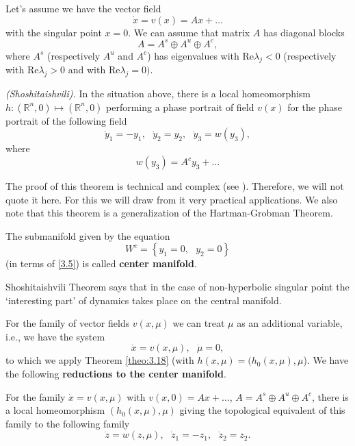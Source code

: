 Let's assume we have the vector field
$$
\dot{x}=v(x)=Ax+\ldots
$$
with the singular point $x = 0$. We can assume that matrix $A$ has diagonal blocks
\begin{equation}
\label{3.4}
A=A^{s}\oplus A^{u}\oplus A^{c},
\end{equation}
where $A^s$ (respectively $A^{u}$ and $A^{c}$) has eigenvalues with $\textrm{Re}\lambda _{j}<0$ (respectively with $\textrm{Re}\lambda _{j}>0$ and with $\textrm{Re}\lambda _{j}=0).$

\begin{theorem}\emph{(Shoshitaishvili).} \label{theo:3.18}
	In the situation above, there is a local homeomorphism $h:\left( \mathbb{R}^{n},0\right) \longmapsto \left( \mathbb{R}^{n},0\right) $ performing a phase portrait of field $v(x)$ for the phase portrait of the following field
	\begin{equation}
	\label{3.5}
	\dot{y}_{1}=-y_{1},\text{ \ }\dot{y}_{2}=y_{2},\text{ \ }\dot{y}%
	_{3}=w(y_{3}),
	\end{equation}
	where
	$$
	w(y_{3})=A^{c}y_{3}+\ldots
	$$
\end{theorem}

The proof of this theorem is technical and complex (see \cite{Ar2}). Therefore, we will not quote it here. For this we will draw from it very practical applications. We also note that this theorem is a generalization of the Hartman-Grobman Theorem.

\begin{definition}
	The submanifold given by the equation
	$$
	W^{c}=\left\{ y_{1}=0,\text{ }y_{2}=0\right\}
	$$
	(in terms of \eqref{3.5}) is called \textbf{center manifold}.
\end{definition}

Shoshitaishvili Theorem says that in the case of non-hyperbolic singular point the `interesting part' of dynamics takes place on the central manifold.

For the family of vector fields $v(x,\mu )$ we can treat $\mu$ as an additional variable, i.e., we have the system
$$
\dot{x}=v(x,\mu ),\text{ \ }\dot{\mu}=0,
$$
to which we apply Theorem \ref{theo:3.18} (with $h(x,\mu )=(h_{0}(x,\mu ),\mu
$). We have the following \textbf{reductions to the center manifold}.

\begin{proposition}
	For the family $\dot{x}=v(x,\mu )$ with $v(x,0)=Ax+\ldots $, $A = A^{s}\oplus A^{u}\oplus A^{c}$, there is a local homeomorphism $(h_{0}(x,\mu ),\mu )$ giving the topological equivalent of this family to the following family
	$$
	\dot{z}=w(z,\mu ),\text{ \ }\dot{z}_{1}=-z_{1},\text{ \ }\dot{z}_{2}=z_{2}.
	$$
\end{proposition}

